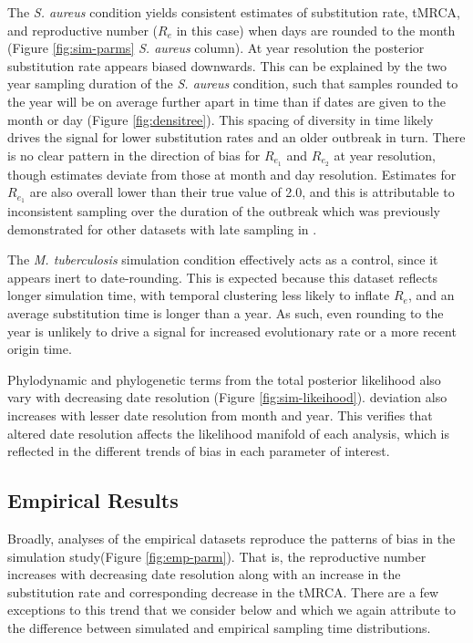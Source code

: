 \documentclass[12pt]{article}
\begin{document}
\begin{spacing}{2}
The \textit{S. aureus} condition yields consistent estimates of substitution rate, tMRCA, and reproductive number ($R_e$ in this case) when days are rounded to the month (Figure \ref{fig:sim-parms} \textit{S. aureus} column). At year resolution the posterior substitution rate appears biased downwards. This can be explained by the two year sampling duration of the \textit{S. aureus} condition, such that samples rounded to the year will be on average further apart in time than if dates are given to the month or day (Figure \ref{fig:densitree}). This spacing of diversity in time likely drives the signal for lower substitution rates and an older outbreak in turn. There is no clear pattern in the direction of bias for $R_{e_1}$ and $R_{e_2}$ at year resolution, though estimates deviate from those at month and day resolution. Estimates for $R_{e_1}$ are also overall lower than their true value of 2.0, and this is attributable to inconsistent sampling over the duration of the outbreak which was previously demonstrated for other datasets with late sampling in \cite{featherstone_infectious_2021}.

The \textit{M. tuberculosis} simulation condition effectively acts as a control, since it appears inert to date-rounding. This is expected because this dataset reflects longer simulation time, with temporal clustering less likely to inflate $R_e$, and an average substitution time is longer than a year. As such, even rounding to the year is unlikely to drive a signal for increased evolutionary rate or a more recent origin time.

Phylodynamic and phylogenetic terms from the total posterior likelihood also vary with decreasing date resolution (Figure \ref{fig:sim-likeihood}). deviation also increases with lesser date resolution from month and year. This verifies that altered date resolution affects the likelihood manifold of each analysis, which is reflected in the different trends of bias in each parameter of interest.

\subsection*{Empirical Results}
Broadly, analyses of the empirical datasets reproduce the patterns of bias in the simulation study(Figure \ref{fig:emp-parm}). That is, the reproductive number increases with decreasing date resolution along with an increase in the substitution rate and corresponding decrease in the tMRCA. There are a few exceptions to this trend that we consider below and which we again attribute to the difference between simulated and empirical sampling time distributions.


\end{spacing}
\end{document}
